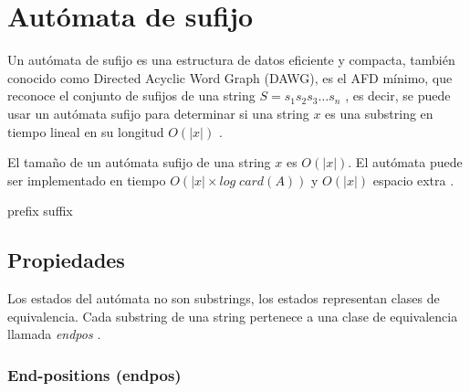 \section{Autómata de sufijo}\label{SuffixAutomaton}
Un autómata de sufijo es una estructura de datos eficiente y compacta, también conocido como Directed Acyclic Word Graph (DAWG), es el \acrshort{AFD} mínimo, que reconoce el conjunto de sufijos de una \gls{string} $S  = s_1 s_2 s_3 \dots s_n $ \cite{wiki:Suffix_automaton}, es decir, se puede usar un autómata sufijo para determinar si una \gls{string} $x$ es una \gls{substring} en tiempo lineal en su longitud $O(| x |)$ \cite{article:10.1016/j.tcs.2009.03.034}.

\begin{theorem}[Principal]
El tamaño de un autómata sufijo de una \gls{string} $x$ es $O(| x |)$. El autómata puede ser implementado en tiempo $O(| x | \times log \; card(A))$ y $O(|x|)$ espacio extra \cite{book:Crochemore1997}.
\end{theorem}

\gls{prefix}
\gls{suffix}

\subsection{Propiedades}
Los estados del autómata no son \glspl{substring}, los estados representan clases de equivalencia. Cada \gls{substring} de una \gls{string} pertenece a una clase de equivalencia llamada \textit{endpos} \cite{youtube:Automatas_de_Sufijos}.

\subsubsection{End-positions (endpos)}


